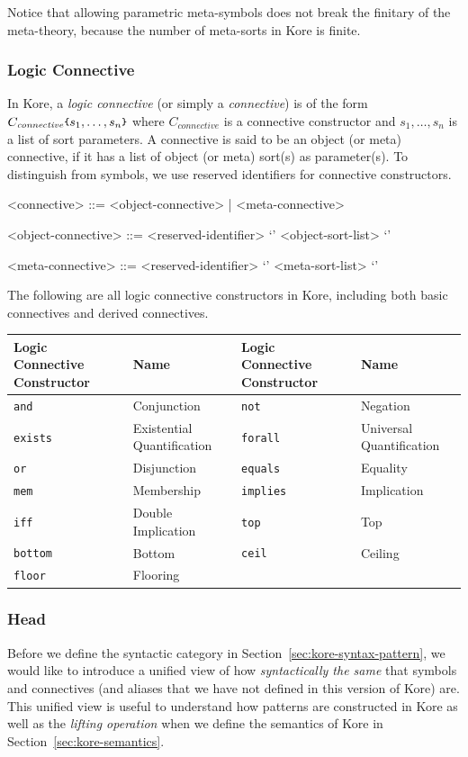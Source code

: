 \documentclass[UTF8,11pt]{article}
\theoremstyle{plain}
\theoremstyle{definition}
\theoremstyle{remark}
\newcommand{\parametric}[2]{{#1}\raisebox{.2ex}{\texttt{\footnotesize{\{}}}#2\raisebox{.2ex}{\texttt{\footnotesize{\}}}}}
\newcommand{\slashsymbol}{\symbol{92}}
\newcommand{\slsh}[1]{\texttt{\slashsymbol#1}}
\newcommand{\sland}{\slsh{and}}
\newcommand{\slor}{\slsh{or}}
\newcommand{\slnot}{\slsh{not}}
\newcommand{\slimplies}{\slsh{implies}}
\newcommand{\sliff}{\slsh{iff}}
\newcommand{\slequals}{\slsh{equals}}
\newcommand{\slexists}{\slsh{exists}}
\newcommand{\slforall}{\slsh{forall}}
\newcommand{\sltop}{\slsh{top}}
\newcommand{\slbottom}{\slsh{bottom}}
\newcommand{\slceil}{\slsh{ceil}}
\newcommand{\slfloor}{\slsh{floor}}
\newcommand{\slmem}{\slsh{mem}}
\newcommand{\itconnective}{\mathit{connective}}
\newcommand{\syntacc}[1]{\text{$\langle$\textit{#1}$\rangle$}}
\begin{document}
Notice that allowing parametric meta-symbols does not break the finitary of the 
meta-theory, because the number of meta-sorts in Kore is finite.

\subsubsection{Logic Connective}
In Kore, a \emph{logic connective} (or simply a \emph{connective}) is of the 
form $\parametric{C_\itconnective}{s_1,\dots,s_n}$ where $C_\itconnective$ is a 
connective constructor and $s_1,\dots,s_n$ is a list of sort parameters.
A connective is said to be an object (or meta) connective, if it has a list of 
object (or meta) sort(s) as parameter(s).
To distinguish from symbols, we use reserved identifiers for connective 
constructors.
\begin{grammar}\small
	<connective> ::= <object-connective> | <meta-connective>
	
	<object-connective> ::= <reserved-identifier> `{' <object-sort-list> `}'
	
	<meta-connective> ::= <reserved-identifier> `{' <meta-sort-list> `}'
\end{grammar}



The following are all logic connective constructors in Kore, including both 
basic connectives and derived connectives.

\begin{center}
\begin{tabular}{p{3cm}|l|p{3cm}|l}
  Logic Connective Constructor & Name & Logic Connective Constructor & 
  Name
  \\\hline
  \sland & Conjunction & \slnot & Negation
  \\\hline
  \slexists & Existential Quantification & \slforall & Universal Quantification 
  \\\hline
  \slor & Disjunction & \slequals & Equality
  \\\hline
  \slmem & Membership & \slimplies & Implication
  \\\hline
  \sliff & Double Implication & \sltop & Top
  \\\hline
  \slbottom & Bottom & \slceil & Ceiling
  \\\hline
  \slfloor & Flooring
\end{tabular}
\end{center}

\subsubsection{Head}
Before we define the syntactic category \syntacc{pattern} in 
Section~\ref{sec:kore-syntax-pattern}, we would like to 
introduce a unified view of how \emph{syntactically the same} that symbols and 
connectives (and aliases that we have not defined in this version of Kore) are.
This unified view is useful to understand how patterns are constructed in Kore 
as well as the \emph{lifting operation} when we define the semantics of Kore in 
Section~\ref{sec:kore-semantics}.
\end{document}
